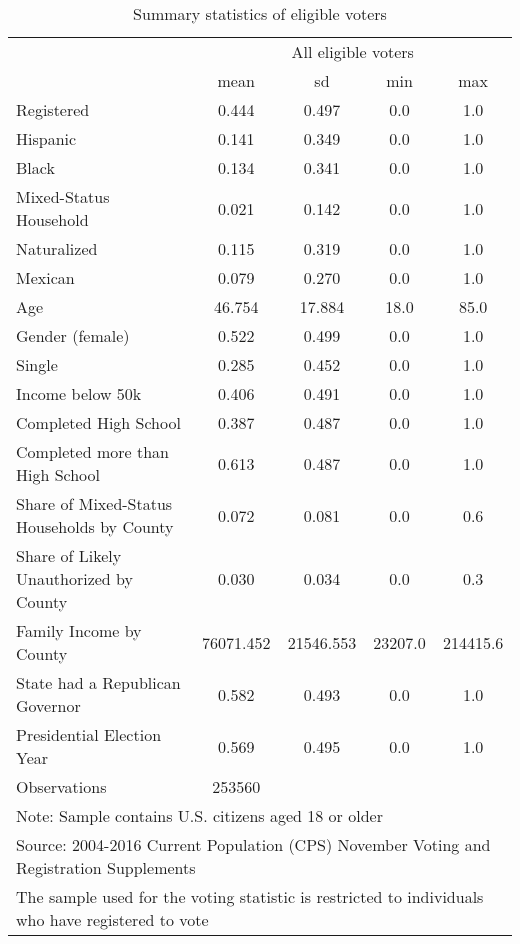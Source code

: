 \begin{table}[htbp]\centering
\def\sym#1{\ifmmode^{#1}\else\(^{#1}\)\fi}
\caption{Summary statistics of eligible voters}
\begin{tabular}{l*{1}{cccc}}
\toprule
                &\multicolumn{4}{c}{All eligible voters}\\
                &     mean&       sd&      min&      max\\
\midrule
Registered      &    0.444&    0.497&      0.0&      1.0\\
Hispanic        &    0.141&    0.349&      0.0&      1.0\\
Black           &    0.134&    0.341&      0.0&      1.0\\
Mixed-Status Household&    0.021&    0.142&      0.0&      1.0\\
Naturalized     &    0.115&    0.319&      0.0&      1.0\\
Mexican         &    0.079&    0.270&      0.0&      1.0\\
Age             &   46.754&   17.884&     18.0&     85.0\\
Gender (female) &    0.522&    0.499&      0.0&      1.0\\
Single          &    0.285&    0.452&      0.0&      1.0\\
Income below 50k&    0.406&    0.491&      0.0&      1.0\\
Completed High School&    0.387&    0.487&      0.0&      1.0\\
Completed more than High School&    0.613&    0.487&      0.0&      1.0\\
Share of Mixed-Status Households by County&    0.072&    0.081&      0.0&      0.6\\
Share of Likely Unauthorized by County&    0.030&    0.034&      0.0&      0.3\\
Family Income by County&76071.452&21546.553&  23207.0& 214415.6\\
State had a Republican Governor&    0.582&    0.493&      0.0&      1.0\\
Presidential Election Year&    0.569&    0.495&      0.0&      1.0\\
\midrule
Observations    &   253560&         &         &         \\
\bottomrule
\multicolumn{5}{l}{\footnotesize Note: Sample contains U.S. citizens aged 18 or older}\\
\multicolumn{5}{l}{\footnotesize Source: 2004-2016 Current Population (CPS) November Voting and Registration Supplements}\\
\multicolumn{5}{l}{\footnotesize The sample used for the voting statistic is restricted to individuals who have registered to vote}\\
\end{tabular}
\end{table}
